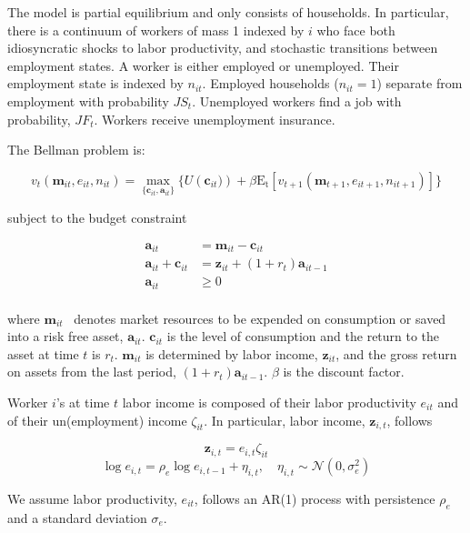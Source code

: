The model is partial equilibrium and only consists of households. In particular, there is a continuum of workers of mass 1 indexed by $i$ who face both idiosyncratic shocks to labor productivity, and stochastic transitions between employment states. A worker is either employed or unemployed. Their employment state is indexed by $n_{it}$. Employed households ($n_{it} = 1$) separate from employment with probability $JS_{t}$. Unemployed workers find a job with probability, $JF_{t}$. Workers receive unemployment insurance.



The Bellman problem is:

$$    v_{t}\left(\mathbf{m}_{it} , e_{it}, n_{it}  \right)  =  \max_{\{\mathbf{c}_{it} , \mathbf{a}_{it}\}} \{U\left(\mathbf{c}_{it})\right)  + \beta \mathrm{E_{t}} \left[ v_{t+1}\left( \mathbf{m}_{t+1},e_{it+1}, n_{it+1} \right)\right] \}
$$ 


subject to the budget constraint 

\begin{align*}
\mathbf{a}_{it}     &= \mathbf{m}_{it} - \mathbf{c}_{it}    \\
\mathbf{a}_{it} +\mathbf{c}_{it}    &= \mathbf{z}_{it} +   (1 + r_{t} ) \mathbf{a}_{it-1} \\ 
\mathbf{a}_{it}  &\geq 0 \\
\end{align*}



where
 $\mathbf{m}_{it}$ \ denotes market resources to be expended on consumption or saved into a risk free asset, $ \mathbf{a}_{it}$. $\mathbf{c}_{it}$ is the level of consumption and the return to the asset at time $t$ is $r_{t}$.  $\mathbf{m}_{it}$ is determined by labor income,  $\mathbf{z}_{it}$, and the gross return on assets from the last period, $(1+r_{t}) \mathbf{a}_{it-1} $. $\beta$ is the discount factor.



Worker $i$'s at time $t$ labor income is composed of their labor productivity $e_{it}$ and of their un(employment) income $\zeta_{it}$. In particular, labor income, $\mathbf{z}_{i,t}$, follows

$$\mathbf{z}_{i,t} = e_{i,t}\zeta_{it}$$
$$ \log e_{i,t} = \rho_{e} \log e_{i,t-1} + \eta_{i,t}, \quad \eta_{i,t} \sim \mathcal{N}(0, \sigma^2_e)$$



We assume labor productivity, $e_{it}$, follows an AR(1) process with persistence $\rho_{e}$ and a standard deviation $\sigma_e$. 

